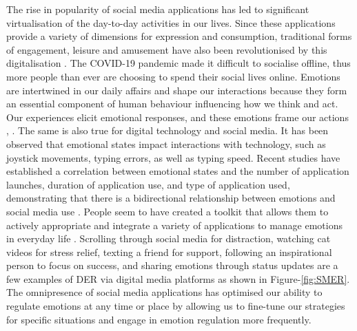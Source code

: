 \documentclass[lettersize,journal]{IEEEtran}
\begin{document}
The rise in popularity of social media applications has led to significant virtualisation of the day-to-day activities in our lives. Since these applications provide a variety of dimensions for expression and consumption, traditional forms of engagement, leisure and amusement have also been revolutionised by this digitalisation \cite{schull2012addiction}. The COVID-19 pandemic made it difficult to socialise offline, thus more people than ever are choosing to spend their social lives online. Emotions are intertwined in our daily affairs and shape our interactions because they form an essential component of human behaviour influencing how we think and act. Our experiences elicit emotional responses, and these emotions frame our actions \cite{gross1998emerging}, \cite{gross2015emotion}. The same is also true for digital technology and social media. It has been observed that emotional states impact interactions with technology, such as joystick movements, typing errors, as well as typing speed. Recent studies have established a correlation between emotional states and the number of application launches, duration of application use, and type of application used, demonstrating that there is a bidirectional relationship between emotions and social media use \cite{sarsenbayeva2020does}. People seem to have created a toolkit that allows them to actively appropriate and integrate a variety of applications to manage emotions in everyday life \cite{smith2022digital}. Scrolling through social media for distraction, watching cat videos for stress relief, texting a friend for support, following an inspirational person to focus on success, and sharing emotions through status updates are a few examples of DER via digital media platforms as shown in Figure-\ref{fig:SMER}. The omnipresence of social media applications has optimised our ability to regulate emotions at any time or place by allowing us to fine-tune our strategies for specific situations and engage in emotion regulation more frequently.
\end{document}
